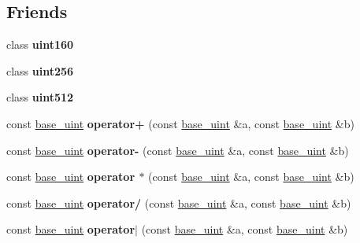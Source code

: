 \subsection*{Friends}
\begin{DoxyCompactItemize}
\item 
\mbox{\label{classbase__uint_aa02da58f540b087723acd9a92ceca5f1}} 
class {\bfseries uint160}
\item 
\mbox{\label{classbase__uint_a2748616a40a1e4fdd6db14b92e9619e2}} 
class {\bfseries uint256}
\item 
\mbox{\label{classbase__uint_a0d7ebbc9f372d8d9d46f50083d0aaad7}} 
class {\bfseries uint512}
\item 
\mbox{\label{classbase__uint_ab46abc7a4c02bbbe6ee4d44db58f36fd}} 
const \mbox{\hyperlink{classbase__uint}{base\+\_\+uint}} {\bfseries operator+} (const \mbox{\hyperlink{classbase__uint}{base\+\_\+uint}} \&a, const \mbox{\hyperlink{classbase__uint}{base\+\_\+uint}} \&b)
\item 
\mbox{\label{classbase__uint_a42603f675219a79c1087da39677dd6d3}} 
const \mbox{\hyperlink{classbase__uint}{base\+\_\+uint}} {\bfseries operator-\/} (const \mbox{\hyperlink{classbase__uint}{base\+\_\+uint}} \&a, const \mbox{\hyperlink{classbase__uint}{base\+\_\+uint}} \&b)
\item 
\mbox{\label{classbase__uint_a25d8b19e2def66185a4a38f17d01ccd7}} 
const \mbox{\hyperlink{classbase__uint}{base\+\_\+uint}} {\bfseries operator $\ast$} (const \mbox{\hyperlink{classbase__uint}{base\+\_\+uint}} \&a, const \mbox{\hyperlink{classbase__uint}{base\+\_\+uint}} \&b)
\item 
\mbox{\label{classbase__uint_a3027097ea3718db496e486d5c64a6bbd}} 
const \mbox{\hyperlink{classbase__uint}{base\+\_\+uint}} {\bfseries operator/} (const \mbox{\hyperlink{classbase__uint}{base\+\_\+uint}} \&a, const \mbox{\hyperlink{classbase__uint}{base\+\_\+uint}} \&b)
\item 
\mbox{\label{classbase__uint_af11d7776598f6633c139636314f065d6}} 
const \mbox{\hyperlink{classbase__uint}{base\+\_\+uint}} {\bfseries operator$\vert$} (const \mbox{\hyperlink{classbase__uint}{base\+\_\+uint}} \&a, const \mbox{\hyperlink{classbase__uint}{base\+\_\+uint}} \&b)

\end{DoxyCompactItemize}
